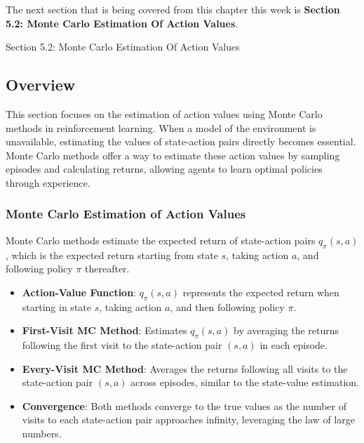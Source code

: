 The next section that is being covered from this chapter this week is \textbf{Section 5.2: Monte Carlo Estimation Of Action Values}.

\begin{notes}{Section 5.2: Monte Carlo Estimation Of Action Values}
    \subsection*{Overview}

    This section focuses on the estimation of action values using Monte Carlo methods in reinforcement learning. When a model of the environment is unavailable, estimating the values of state-action pairs 
    directly becomes essential. Monte Carlo methods offer a way to estimate these action values by sampling episodes and calculating returns, allowing agents to learn optimal policies through experience.
    
    \subsubsection*{Monte Carlo Estimation of Action Values}
    
    Monte Carlo methods estimate the expected return of state-action pairs $q_\pi(s, a)$, which is the expected return starting from state $s$, taking action $a$, and following policy $\pi$ thereafter.
    
    \begin{highlight}
    
        \begin{itemize}
            \item \textbf{Action-Value Function}: $q_\pi(s, a)$ represents the expected return when starting in state $s$, taking action $a$, and then following policy $\pi$.
            \item \textbf{First-Visit MC Method}: Estimates $q_\pi(s, a)$ by averaging the returns following the first visit to the state-action pair $(s, a)$ in each episode.
            \item \textbf{Every-Visit MC Method}: Averages the returns following all visits to the state-action pair $(s, a)$ across episodes, similar to the state-value estimation.
            \item \textbf{Convergence}: Both methods converge to the true values as the number of visits to each state-action pair approaches infinity, leveraging the law of large numbers.
        \end{itemize}
    

\end{highlight}
\end{notes}
